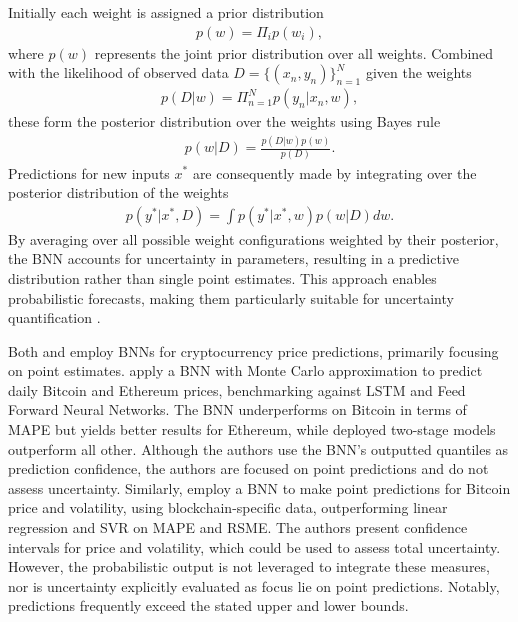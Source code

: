 Initially each weight is assigned a prior distribution
\begin{equation}
    \begin{gathered}
        p(w) = \Pi_{i} p(w_i),
    \end{gathered}
\end{equation}
where $p(w)$ represents the joint prior distribution over all weights. Combined with the likelihood of observed data $D = \{(x_n,y_n)\}_{n=1}^N$ given the weights
\begin{equation}
    \begin{gathered}    
        p(D|w) = \Pi_{n=1}^Np(y_n|x_n,w),
    \end{gathered}
\end{equation}
these form the posterior distribution over the weights using Bayes rule \parencite[p. 46]{pml1Book}
\begin{equation}
    \begin{gathered}
        p(w|D) = \frac{p(D|w)p(w)}{p(D)}.
    \end{gathered}
    \label{eq:bayes_theorem} 
\end{equation}
Predictions for new inputs $x^*$ are consequently made by integrating over the posterior distribution of the weights
\begin{equation}
    \begin{gathered}
        p(y^*|x^*,D) = \int p(y^*|x^*,w)p(w|D)dw.
    \end{gathered}
\end{equation}
By averaging over all possible weight configurations weighted by their posterior, the BNN accounts for uncertainty in parameters, resulting in a predictive distribution rather than single point estimates. This approach enables probabilistic forecasts, making them particularly suitable for uncertainty quantification \parencite{jospin2022hands}.

Both \textcite{cocco2021predictions} and \textcite{jang2018empirical} employ BNNs for cryptocurrency price predictions, primarily focusing on point estimates. \textcite{cocco2021predictions} apply a BNN with Monte Carlo approximation to predict daily Bitcoin and Ethereum prices, benchmarking against LSTM and Feed Forward Neural Networks. The BNN underperforms on Bitcoin in terms of MAPE but yields better results for Ethereum, while deployed two-stage models outperform all other. Although the authors use the BNN's outputted quantiles as prediction confidence, the authors are focused on point predictions and do not assess uncertainty. Similarly, \textcite{jang2018empirical} employ a BNN to make point predictions for Bitcoin price and volatility, using blockchain-specific data, outperforming linear regression and SVR on MAPE and RSME. The authors present confidence intervals for price and volatility, which could be used to assess total uncertainty. However, the probabilistic output is not leveraged to integrate these measures, nor is uncertainty explicitly evaluated as focus lie on point predictions. Notably, predictions frequently exceed the stated upper and lower bounds. 

